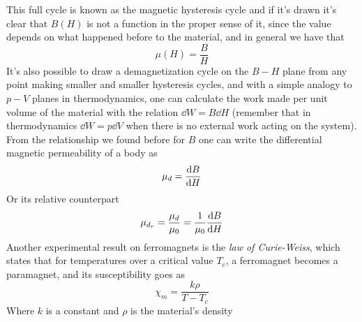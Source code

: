 \documentclass[../electromagnetism.tex]{subfiles}
\begin{document}
This full cycle is known as the magnetic hysteresis cycle and if it's drawn it's clear that $B(H)$ is not a function in the proper sense of it, since the value depends on what happened before to the material, and in general we have that
\begin{equation}
	\mu(H)=\frac{B}{H}
	\label{eq:mudeponH}
\end{equation}
It's also possible to draw a demagnetization cycle on the $B-H$ plane from any point making smaller and smaller hysteresis cycles, and with a simple analogy to $p-V$ planes in thermodynamics, one can calculate the work made per unit volume of the material with the relation $\dd W=B\dd H$ (remember that in thermodynamics $\dd W=p\dd V$ when there is no external work acting on the system).\\
From the relationship we found before for $B$ one can write the differential magnetic permeability of a body as
\begin{equation*}
	\mu_d=\dv{B}{H}
\end{equation*}
Or its relative counterpart
\begin{equation*}
	\mu_{d_r}=\frac{\mu_d}{\mu_0}=\frac{1}{\mu_0}\dv{B}{H}
\end{equation*}
Another experimental result on ferromagnets is the \textit{law of Curie-Weiss}, which states that for temperatures over a critical value $T_c$, a ferromagnet becomes a paramagnet, and its susceptibility goes as
\begin{equation}
	\chi_m=\frac{k\rho}{T-T_c}
	\label{eq:curieweiss}
\end{equation}
Where $k$ is a constant and $\rho$ is the material's density
\end{document}

